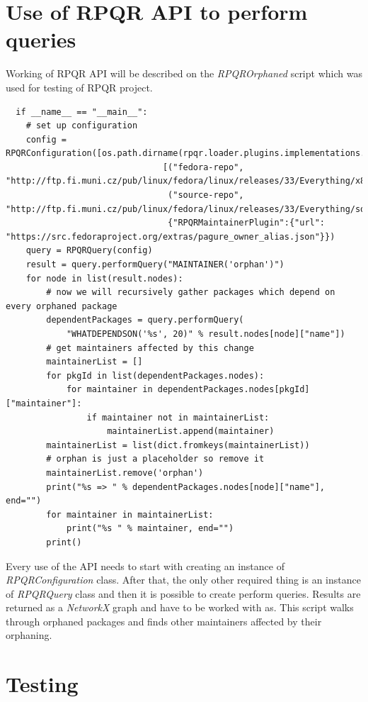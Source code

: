 \section{Use of RPQR API to perform queries}

Working of RPQR API will be described on the \textit{RPQROrphaned} script which was used for testing
of RPQR project.

\begin{lstlisting}
  if __name__ == "__main__":
    # set up configuration
    config = RPQRConfiguration([os.path.dirname(rpqr.loader.plugins.implementations.__file__)],
                               [("fedora-repo", "http://ftp.fi.muni.cz/pub/linux/fedora/linux/releases/33/Everything/x86_64/os/"),
                                ("source-repo", "http://ftp.fi.muni.cz/pub/linux/fedora/linux/releases/33/Everything/source/tree/")],
                                {"RPQRMaintainerPlugin":{"url": "https://src.fedoraproject.org/extras/pagure_owner_alias.json"}})
    query = RPQRQuery(config)
    result = query.performQuery("MAINTAINER('orphan')")
    for node in list(result.nodes):
        # now we will recursively gather packages which depend on every orphaned package
        dependentPackages = query.performQuery(
            "WHATDEPENDSON('%s', 20)" % result.nodes[node]["name"])
        # get maintainers affected by this change
        maintainerList = []
        for pkgId in list(dependentPackages.nodes):
            for maintainer in dependentPackages.nodes[pkgId]["maintainer"]:
                if maintainer not in maintainerList:
                    maintainerList.append(maintainer)
        maintainerList = list(dict.fromkeys(maintainerList))
        # orphan is just a placeholder so remove it
        maintainerList.remove('orphan')
        print("%s => " % dependentPackages.nodes[node]["name"], end="")
        for maintainer in maintainerList:
            print("%s " % maintainer, end="")
        print()
\end{lstlisting}

Every use of the API needs to start with creating an instance of \textit{RPQRConfiguration} class.
After that, the only other required thing is an instance of \textit{RPQRQuery} class and then it is
possible to create perform queries. Results are returned as a \textit{NetworkX} graph and have to be
worked with as. This script walks through orphaned packages and finds other maintainers affected by
their orphaning. 

\section{Testing}

